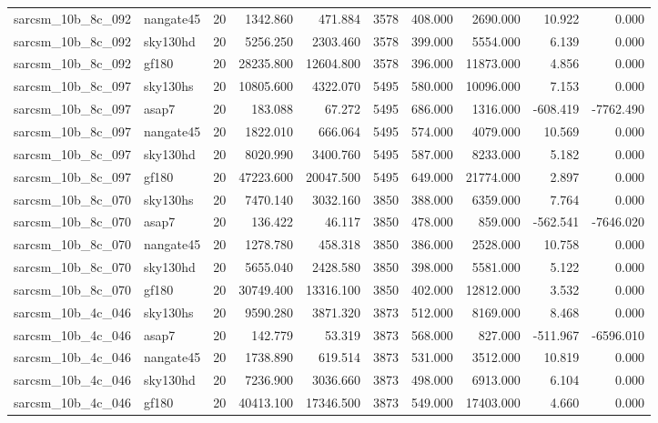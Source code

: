 \begin{longtable}{llrrrrrrrr}
sarcsm\_10b\_8c\_092 & nangate45 & 20 & 1342.860 & 471.884 & 3578 & 408.000 & 2690.000 & 10.922 & 0.000 \\
sarcsm\_10b\_8c\_092 & sky130hd & 20 & 5256.250 & 2303.460 & 3578 & 399.000 & 5554.000 & 6.139 & 0.000 \\
sarcsm\_10b\_8c\_092 & gf180 & 20 & 28235.800 & 12604.800 & 3578 & 396.000 & 11873.000 & 4.856 & 0.000 \\
sarcsm\_10b\_8c\_097 & sky130hs & 20 & 10805.600 & 4322.070 & 5495 & 580.000 & 10096.000 & 7.153 & 0.000 \\
sarcsm\_10b\_8c\_097 & asap7 & 20 & 183.088 & 67.272 & 5495 & 686.000 & 1316.000 & -608.419 & -7762.490 \\
sarcsm\_10b\_8c\_097 & nangate45 & 20 & 1822.010 & 666.064 & 5495 & 574.000 & 4079.000 & 10.569 & 0.000 \\
sarcsm\_10b\_8c\_097 & sky130hd & 20 & 8020.990 & 3400.760 & 5495 & 587.000 & 8233.000 & 5.182 & 0.000 \\
sarcsm\_10b\_8c\_097 & gf180 & 20 & 47223.600 & 20047.500 & 5495 & 649.000 & 21774.000 & 2.897 & 0.000 \\
sarcsm\_10b\_8c\_070 & sky130hs & 20 & 7470.140 & 3032.160 & 3850 & 388.000 & 6359.000 & 7.764 & 0.000 \\
sarcsm\_10b\_8c\_070 & asap7 & 20 & 136.422 & 46.117 & 3850 & 478.000 & 859.000 & -562.541 & -7646.020 \\
sarcsm\_10b\_8c\_070 & nangate45 & 20 & 1278.780 & 458.318 & 3850 & 386.000 & 2528.000 & 10.758 & 0.000 \\
sarcsm\_10b\_8c\_070 & sky130hd & 20 & 5655.040 & 2428.580 & 3850 & 398.000 & 5581.000 & 5.122 & 0.000 \\
sarcsm\_10b\_8c\_070 & gf180 & 20 & 30749.400 & 13316.100 & 3850 & 402.000 & 12812.000 & 3.532 & 0.000 \\
sarcsm\_10b\_4c\_046 & sky130hs & 20 & 9590.280 & 3871.320 & 3873 & 512.000 & 8169.000 & 8.468 & 0.000 \\
sarcsm\_10b\_4c\_046 & asap7 & 20 & 142.779 & 53.319 & 3873 & 568.000 & 827.000 & -511.967 & -6596.010 \\
sarcsm\_10b\_4c\_046 & nangate45 & 20 & 1738.890 & 619.514 & 3873 & 531.000 & 3512.000 & 10.819 & 0.000 \\
sarcsm\_10b\_4c\_046 & sky130hd & 20 & 7236.900 & 3036.660 & 3873 & 498.000 & 6913.000 & 6.104 & 0.000 \\
sarcsm\_10b\_4c\_046 & gf180 & 20 & 40413.100 & 17346.500 & 3873 & 549.000 & 17403.000 & 4.660 & 0.000 \\

\end{longtable}
